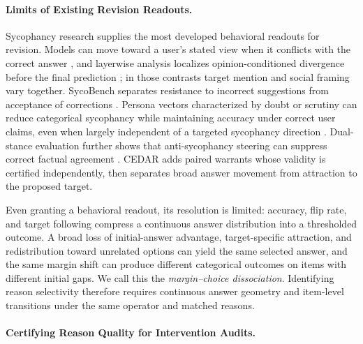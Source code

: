 \documentclass[letterpaper]{article} %
\begin{document}
\paragraph{Limits of Existing Revision Readouts.}

Sycophancy research supplies the most developed behavioral readouts for revision. Models can move toward a user's stated view when it conflicts with the correct answer \citep{sharma2024towards}, and layerwise analysis localizes opinion-conditioned divergence before the final prediction \citep{wang2026truth}; in those contrasts target mention and social framing vary together. SycoBench separates resistance to incorrect suggestions from acceptance of corrections \citep{sinha2026sycobench}. Persona vectors characterized by doubt or scrutiny can reduce categorical sycophancy while maintaining accuracy under correct user claims, even when largely independent of a targeted sycophancy direction \citep{kelkar2026devil}. Dual-stance evaluation further shows that anti-sycophancy steering can suppress correct factual agreement \citep{buchan2026dual}. CEDAR adds paired warrants whose validity is certified independently, then separates broad answer movement from attraction to the proposed target.

Even granting a behavioral readout, its resolution is limited: accuracy, flip rate, and target following compress a continuous answer distribution into a thresholded outcome. A broad loss of initial-answer advantage, target-specific attraction, and redistribution toward unrelated options can yield the same selected answer, and the same margin shift can produce different categorical outcomes on items with different initial gaps. We call this the \emph{margin--choice dissociation}. Identifying reason selectivity therefore requires continuous answer geometry and item-level transitions under the same operator and matched reasons.

\paragraph{Certifying Reason Quality for Intervention Audits.}
\end{document}
